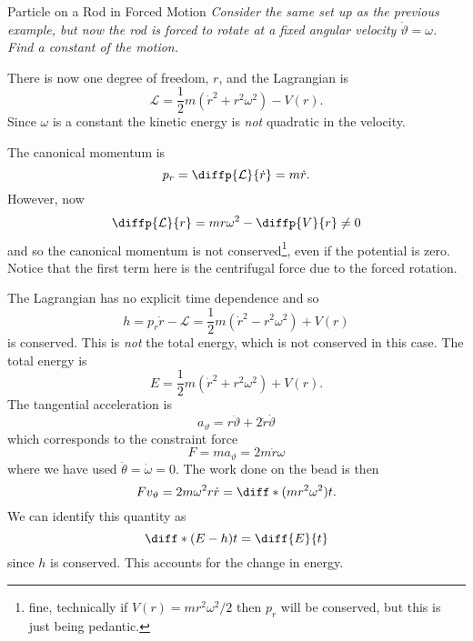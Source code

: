 \documentclass[fleqn]{NotesClass}
\newcommand*{\lagrangian}{\mathcal{L}}
\begin{document}
    \begin{exm}{Particle on a Rod in Forced Motion}{}
        \textit{Consider the same set up as the previous example, but now the rod is forced to rotate at a fixed angular velocity \(\dot{\vartheta} = \omega\). Find a constant of the motion.}
        
        There is now one degree of freedom, \(r\), and the Lagrangian is
        \begin{equation}
            \lagrangian = \frac{1}{2}m(\dot{r}^2 + r^2\omega^2) - V(r).
        \end{equation}
        Since \(\omega\) is a constant the kinetic energy is \emph{not} quadratic in the velocity.
        
        The canonical momentum is
        \begin{equation}
            p_r = \diffp{\lagrangian}{\dot{r}} = m\dot{r}.
        \end{equation}
        However, now
        \begin{equation}
            \diffp{\lagrangian}{r} = mr\omega^2 - \diffp{V}{r} \ne 0
        \end{equation}
        and so the canonical momentum is not conserved\footnote{fine, technically if \(V(r) = mr^2\omega^2/2\) then \(p_r\) will be conserved, but this is just being pedantic.}, even if the potential is zero.
        Notice that the first term here is the centrifugal force due to the forced rotation.
        
        The Lagrangian has no explicit time dependence and so 
        \begin{equation}
            h = p_r\dot{r} - \lagrangian = \frac{1}{2}m(\dot{r}^2 - r^2\omega^2) + V(r)
        \end{equation}
        is conserved.
        This is \emph{not} the total energy, which is not conserved in this case.
        The total energy is
        \begin{equation}
            E = \frac{1}{2}m(\dot{r}^2 + r^2\omega^2) + V(r).
        \end{equation}
        The tangential acceleration is
        \begin{equation}
            a_{\vartheta} = r\ddot{\vartheta} + 2\dot{r}\dot{\vartheta}
        \end{equation}
        which corresponds to the constraint force
        \begin{equation}
            F = ma_{\vartheta} = 2m\dot{r}\omega
        \end{equation}
        where we have used \(\ddot{\theta} = \dot{\omega} = 0\).
        The work done on the bead is then
        \begin{equation}
            Fv_{\vartheta} = 2m\omega^2r\dot{r} = \diff*{(mr^2\omega^2)}{t}.
        \end{equation}
        We can identify this quantity as
        \begin{equation}
            \diff*{(E - h)}{t} = \diff{E}{t}
        \end{equation}
        since \(h\) is conserved.
        This accounts for the change in energy.
        

\end{exm}
\end{document}
